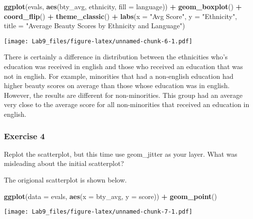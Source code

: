 \documentclass[
]{article}
\newenvironment{Shaded}{\begin{snugshade}}{\end{snugshade}}
\newcommand{\DataTypeTok}[1]{\textcolor[rgb]{0.13,0.29,0.53}{#1}}
\newcommand{\KeywordTok}[1]{\textcolor[rgb]{0.13,0.29,0.53}{\textbf{#1}}}
\newcommand{\NormalTok}[1]{#1}
\newcommand{\OperatorTok}[1]{\textcolor[rgb]{0.81,0.36,0.00}{\textbf{#1}}}
\newcommand{\StringTok}[1]{\textcolor[rgb]{0.31,0.60,0.02}{#1}}
\begin{document}
\begin{Shaded}
\begin{Highlighting}[]
\KeywordTok{ggplot}\NormalTok{(evals, }\KeywordTok{aes}\NormalTok{(bty_avg, ethnicity, }\DataTypeTok{fill =}\NormalTok{ language)) }\OperatorTok{+}\StringTok{ }\KeywordTok{geom_boxplot}\NormalTok{() }\OperatorTok{+}\StringTok{ }\KeywordTok{coord_flip}\NormalTok{() }\OperatorTok{+}\StringTok{ }\KeywordTok{theme_classic}\NormalTok{() }\OperatorTok{+}\StringTok{ }\KeywordTok{labs}\NormalTok{(}\DataTypeTok{x =} \StringTok{"Avg Score"}\NormalTok{, }\DataTypeTok{y =} \StringTok{"Ethnicity"}\NormalTok{, }\DataTypeTok{title =} \StringTok{"Average Beauty Scores by Ethnicity and Language"}\NormalTok{)}
\end{Highlighting}
\end{Shaded}

\texttt{[image: Lab9\_files/figure-latex/unnamed-chunk-6-1.pdf]}

There is certainly a difference in distribution between the ethnicities
who's education was received in english and those who received an
education that was not in english. For example, minorities that had a
non-english education had higher beauty scores on average than those
whose education was in english. However, the results are different for
non-minorities. This group had an average very close to the average
score for all non-minorities that received an education in english.

\hypertarget{exercise-4}{%
\subsubsection{Exercise 4}\label{exercise-4}}

Replot the scatterplot, but this time use geom\_jitter as your layer.
What was misleading about the initial scatterplot?

The origional scatterplot is shown below.

\begin{Shaded}
\begin{Highlighting}[]
\KeywordTok{ggplot}\NormalTok{(}\DataTypeTok{data =}\NormalTok{ evals, }\KeywordTok{aes}\NormalTok{(}\DataTypeTok{x =}\NormalTok{ bty_avg, }\DataTypeTok{y =}\NormalTok{ score)) }\OperatorTok{+}
\StringTok{  }\KeywordTok{geom_point}\NormalTok{()}
\end{Highlighting}
\end{Shaded}

\texttt{[image: Lab9\_files/figure-latex/unnamed-chunk-7-1.pdf]}
\end{document}
